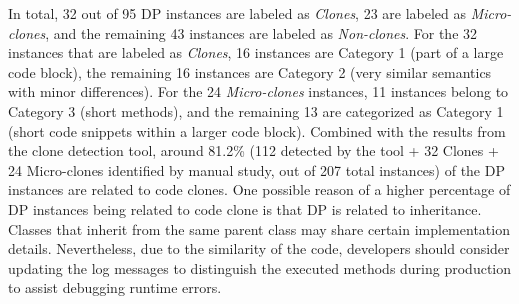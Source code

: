  In total, 32 out of 95 DP instances are labeled as {\em Clones}, 23 are labeled as {\em Micro-clones}, and the remaining 43 instances are labeled as {\em Non-clones}. For the 32 instances that are labeled as {\em Clones}, 16 instances are Category 1 (part of a large code block), the remaining 16 instances are Category 2 (very similar semantics with minor differences). For the 24 {\em Micro-clones} instances, 11 instances belong to Category 3 (short methods), and the remaining 13 are categorized as Category 1 (short code snippets within a larger code block).
Combined with the results from the clone detection tool, around 81.2\% (112 detected by the tool + 32 Clones + 24 Micro-clones identified by manual study, out of 207 total instances) of the DP instances are related to code clones.
One possible reason of a higher percentage of DP instances being related to code clone is that DP is related to inheritance. Classes that inherit from the same parent class may share certain implementation details. Nevertheless, due to the similarity of the code, developers should consider updating the log messages to distinguish the executed methods during production to assist debugging runtime errors.




